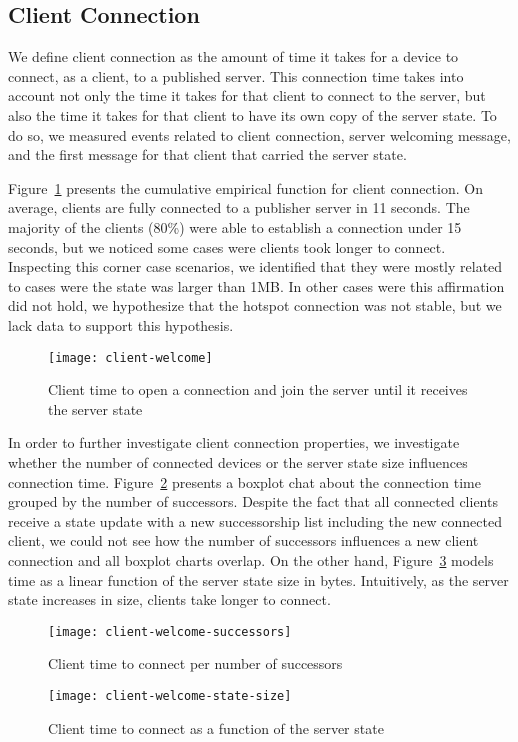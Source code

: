 \subsection{Client Connection}
\label{sub:eval:connection}


We define client connection as the amount of time it takes for a device to connect, as a client, to a published server.
This connection time takes into account not only the time it takes for that client to connect to the server, 
but also the time it takes for that client to have its own copy of the server state. 
To do so, we measured events related to client connection, server welcoming message, and the first message for that client that carried the server state.


Figure~\ref{fig:client-welcome} presents the cumulative empirical function for client connection.
On average, clients are fully connected to a publisher server in 11 seconds. 
The majority of the clients (80\%) were able to establish a connection under 15 seconds, 
but we noticed some cases were clients took longer to connect. 
Inspecting this corner case scenarios, we identified that they were mostly related to cases were the state was larger than 1MB.
In other cases were this affirmation did not hold, we hypothesize that the hotspot connection was not stable, but we lack data to support this hypothesis.


\begin{figure}
    \centering
    \texttt{[image: client-welcome]}
    \caption{Client time to open a connection and join the server until it receives the server state}
    \label{fig:client-welcome}
\end{figure}


In order to further investigate client connection properties, we investigate whether the number of connected devices or the server state size influences connection time.
Figure~\ref{fig:client-welcome-successors} presents a boxplot chat about the connection time grouped by the number of successors.
Despite the fact that all connected clients receive a state update with a new successorship list including the new connected client, 
we could not see how the number of successors influences a new client connection and all boxplot charts overlap.
On the other hand, Figure~\ref{fig:client-welcome-state-size} models time as a linear function of the server state size in bytes.
Intuitively, as the server state increases in size, clients take longer to connect. 


\begin{figure}
    \centering
    \texttt{[image: client-welcome-successors]}
    \caption{Client time to connect per number of successors}
    \label{fig:client-welcome-successors}
\end{figure}

\begin{figure}
    \centering
    \texttt{[image: client-welcome-state-size]}
    \caption{Client time to connect as a function of the server state}
    \label{fig:client-welcome-state-size}
\end{figure}